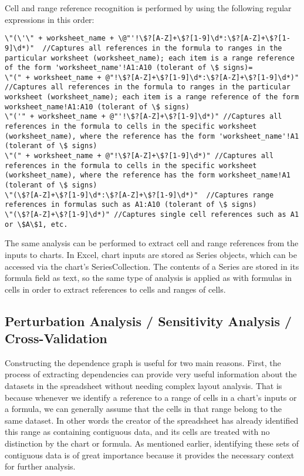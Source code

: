 Cell and range reference recognition is performed by using the following
regular expressions in this order:
\begin{verbatim}
\"(\'\" + worksheet_name + \@"'!\$?[A-Z]+\$?[1-9]\d*:\$?[A-Z]+\$?[1-9]\d*)"  //Captures all references in the formula to ranges in the particular worksheet (worksheet_name); each item is a range reference of the form 'worksheet_name'!A1:A10 (tolerant of \$ signs)=
\"(" + worksheet_name + @"!\$?[A-Z]+\$?[1-9]\d*:\$?[A-Z]+\$?[1-9]\d*)"  //Captures all references in the formula to ranges in the particular worksheet (worksheet_name); each item is a range reference of the form worksheet_name!A1:A10 (tolerant of \$ signs)
\"('" + worksheet_name + @"'!\$?[A-Z]+\$?[1-9]\d*)" //Captures all references in the formula to cells in the specific worksheet (worksheet_name), where the reference has the form 'worksheet_name'!A1 (tolerant of \$ signs)
\"(" + worksheet_name + @"!\$?[A-Z]+\$?[1-9]\d*)" //Captures all references in the formula to cells in the specific worksheet (worksheet_name), where the reference has the form worksheet_name!A1 (tolerant of \$ signs)
\"(\$?[A-Z]+\$?[1-9]\d*:\$?[A-Z]+\$?[1-9]\d*)"  //Captures range references in formulas such as A1:A10 (tolerant of \$ signs)
\"(\$?[A-Z]+\$?[1-9]\d*)" //Captures single cell references such as A1 or \$A\$1, etc.
\end{verbatim}

The same analysis can be performed to extract cell and range references 
from the inputs to charts. In Excel, chart inputs are stored as Series objects, 
which can be accessed via the chart's SeriesCollection. The contents of a Series
are stored in its formula field as text, so the same type of analysis is applied
as with formulas in cells in order to extract references to cells and ranges of cells.

\subsection{Perturbation Analysis / Sensitivity Analysis / Cross-Validation}

Constructing the dependence graph is useful for two main
reasons. First, the process of extracting dependencies can provide
very useful information about the datasets in the spreadsheet without
needing complex layout analysis.  That is because whenever we identify
a reference to a range of cells in a chart's inputs or a formula,
we can generally assume that the cells in that range belong to the same dataset.  In
other words the creator of the spreadsheet has already identified this
range as containing contiguous data, and its cells are treated with no
distinction by the chart or formula.  As mentioned earlier,
identifying these sets of contiguous data is of great importance
because it provides the necessary context for further analysis.

